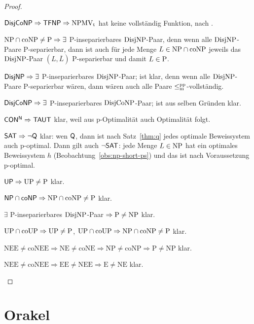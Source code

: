 \begin{proof}
\begin{Prooflist}[nosep]
\item $\hDisjCoNP \Rightarrow \hTFNP \Rightarrow \NPMVt$ hat keine vollständig Funktion, nach \textcite{pudlak_incompleteness_2017}.
\item $\NP\cap\coNP\neq \P \Rightarrow\exists$ P-inseparierbares $\DisjNP$-Paar, denn wenn alle $\DisjNP$-Paare P-separierbar, dann ist auch für jede Menge $L\in\NP\cap\coNP$ jeweils das $\DisjNP$-Paar $(L,\overline{L})$ P-separierbar und damit $L\in\P$.
\item $\hDisjNP \Rightarrow \exists$ P-inseparierbares $\DisjNP$-Paar; ist klar, denn wenn alle $\DisjNP$-Paare P-separierbar wären, dann wären auch alle Paare $\leqmpp$-vollständig.
\item $\hDisjCoNP \Rightarrow \exists$ P-inseparierbares $\DisjCoNP$-Paar; ist aus selben Gründen klar.
\item $\mathsf{CON^N} \Rightarrow \hTAUT$ klar, weil aus p-Optimalität auch Optimalität folgt.
\item $\mathsf \hSAT \Rightarrow \neg\hQ $ klar: wen $\hQ$, dann ist nach Satz~\ref{thm:q} jedes optimale Beweissystem auch p-optimal. Dann gilt auch $\neg\hSAT$: jede Menge $L\in\NP$ hat ein optimales Beweissystem $h$ (Beobachtung~\ref{obs:np-short-ps}) und das ist nach Voraussetzung p-optimal.
\item $\hUP \Rightarrow \UP\neq\P$ klar.
\item $\hNPcoNP \Rightarrow \NP\cap\coNP\neq \P$ klar.
\item $\exists$ P-inseparierbares $\DisjNP$-Paar $\Rightarrow \P\neq \NP$ klar.
\item $\UP\cap\coUP\Rightarrow \UP\neq \P$, $\UP\cap\coUP\Rightarrow \NP\cap\coNP\neq\P$ klar.
\item $\mathrm{NEE\neq coNEE \Rightarrow NE \neq coNE \Rightarrow NP \neq coNP \Rightarrow P\neq NP}$ klar.
\item $\mathrm{NEE\neq coNEE \Rightarrow EE \neq NEE \Rightarrow E\neq NE}$ klar.\qedhere
\end{Prooflist}
\end{proof}

\chapter{Orakel}


